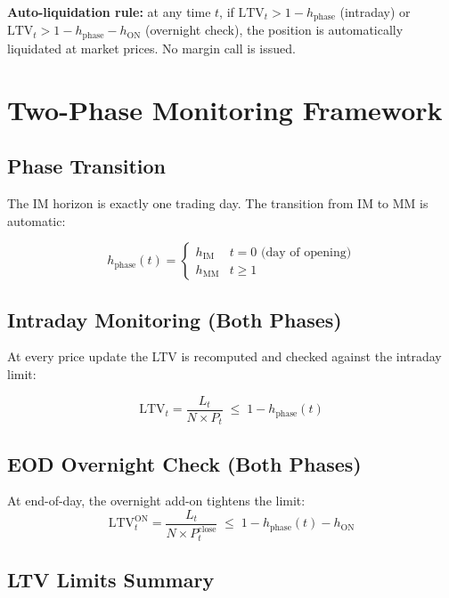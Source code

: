 \documentclass[9pt, a4paper]{extarticle}
\newcommand{\alertbox}[1]{%
    \par\vspace{4pt}%
    \noindent\colorbox{gray!12}{\parbox{\dimexpr\linewidth-2\fboxsep}{%
        \small #1}}%
    \vspace{4pt}\par%
}
\begin{document}
\alertbox{\textbf{Auto-liquidation rule:} at any time $t$, if $\mathrm{LTV}_t > 1 - h_{\mathrm{phase}}$
(intraday) or $\mathrm{LTV}_t > 1 - h_{\mathrm{phase}} - h_{\mathrm{ON}}$ (overnight check),
the position is automatically liquidated at market prices. No margin call is issued.}

\section{Two-Phase Monitoring Framework}
\label{sec:monitoring}

\subsection{Phase Transition}

The IM horizon is exactly one trading day. The transition from IM to MM is automatic:

\[
    h_{\mathrm{phase}}(t) =
    \begin{cases}
        h_{\mathrm{IM}} & t = 0 \text{ (day of opening)} \\
        h_{\mathrm{MM}} & t \geq 1
    \end{cases}
\]

\subsection{Intraday Monitoring (Both Phases)}

At every price update the LTV is recomputed and checked against the intraday limit:

\[
    \mathrm{LTV}_t = \frac{L_t}{N \times P_t} \;\leq\; 1 - h_{\mathrm{phase}}(t)
\]

\subsection{EOD Overnight Check (Both Phases)}

At end-of-day, the overnight add-on tightens the limit:
\[
    \mathrm{LTV}^{\mathrm{ON}}_t = \frac{L_t}{N \times P_t^{\mathrm{close}}}
    \;\leq\; 1 - h_{\mathrm{phase}}(t) - h_{\mathrm{ON}}
\]

\subsection{LTV Limits Summary}
\end{document}
